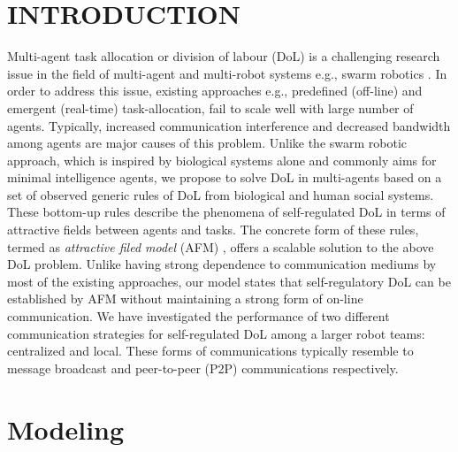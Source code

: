 \documentclass[a4paper, 10pt, conference]{ieeeconf}      %
\begin{document}
\section{INTRODUCTION}
\label{sec:intro}
Multi-agent task allocation or division of labour (DoL) is a challenging research issue in the field of multi-agent and multi-robot systems e.g., swarm robotics \cite{RefSwarm}. In order to address this issue, existing approaches e.g., predefined (off-line) and emergent (real-time) task-allocation, fail to scale well with large number of agents. Typically, increased communication interference and decreased bandwidth among agents are major causes of this problem. Unlike the swarm robotic approach, which is inspired by biological systems alone and commonly aims for minimal intelligence agents, we propose to solve DoL in multi-agents based on a set of observed generic rules of DoL from biological and human social systems. These bottom-up rules describe the phenomena of self-regulated DoL in terms of attractive fields between agents and tasks. The concrete form of these rules, termed as \textit{attractive filed model} (AFM) \cite{RefElsa}, offers a scalable solution to the above DoL problem. Unlike having strong dependence to communication mediums by most of the existing approaches, our model states that self-regulatory DoL can be established by AFM without maintaining a strong form of on-line communication. 
We have investigated the performance of two different communication strategies for self-regulated DoL among a larger robot teams: centralized and local. These forms of communications typically resemble to message broadcast and peer-to-peer (P2P) communications respectively.


\section{Modeling}
\label{sec:model}
\end{document}
